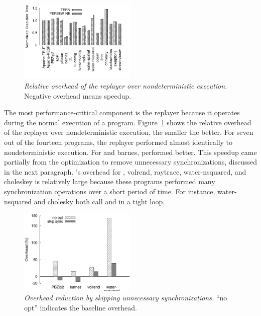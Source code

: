 \begin{figure}[t]
\centering
\includegraphics[width=0.5\textwidth]{tern/figures/overhead}

\caption{\small {\em Relative overhead of the replayer over
    nondeterministic execution.} Negative overhead means speedup.}
\label{fig:tern-overhead}
\end{figure}


The most performance-critical component is the replayer because it
operates during the normal execution of a program.
Figure~\ref{fig:tern-overhead} shows the relative overhead of the replayer over
nondeterministic execution, the smaller the better.  For seven out of
the fourteen programs, the replayer performed almost identically to
nondeterministic execution. For \pbzip and barnes, \tern performed
better.  This speedup came partially from the optimization to remove
unnecessary synchronizations, discussed in the next paragraph.  \tern's overhead
for \mysql, volrend, raytrace, water-nsquared, and choleskey is relatively
large because these programs performed many synchronization operations
over a short period of time.  For instance, water-nsquared and cholesky
both call  and  in a
tight loop.


\begin{figure}[t]
\centering
\includegraphics[width=0.5\textwidth]{tern/figures/opt-overhead}
\caption{\small {\em Overhead reduction by skipping unnecessary
    synchronizations.} ``no opt'' indicates the baseline overhead.}
\label{fig:tern-opt-remove-sync}
\end{figure}

